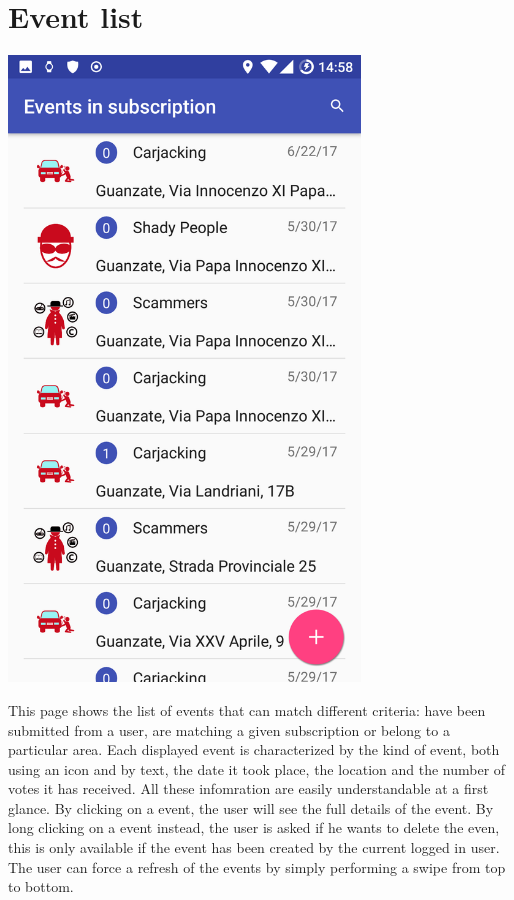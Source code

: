 \documentclass[a4paper]{scrreprt}
\begin{document}
\section{Event list}
\begin{minipage}{0.5\textwidth}
	\centering
	\includegraphics[width=0.7\textwidth]{imgs/event_list}
\end{minipage}
\begin{minipage}{0.5\textwidth}
	This page shows the list of events that can match different criteria: have been submitted from a user, are matching a given subscription or belong to a particular area. Each displayed event is characterized by the kind of event, both using an icon and by text, the date it took place, the location and the number of votes it has received. All these infomration are easily understandable at a first glance. By clicking on a event, the user will see the full details of the event. By long clicking on a event instead, the user is asked if he wants to delete the even, this is only available if the event has been created by the current logged in user. The user can force a refresh of the events by simply performing a swipe from top to bottom. 
\end{minipage}
\end{document}
